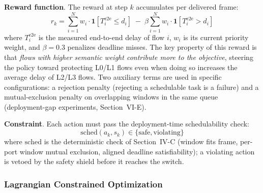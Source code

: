 \documentclass[conference]{IEEEtran}
\begin{document}
\textbf{Reward function}. The reward at step $k$ accumulates per delivered frame:
\begin{equation}
r_k = \sum_{i=1}^{N} w_i \cdot \mathbf{1}[T_i^{\text{e2e}} \leq d_i] \;-\; \beta \sum_{i=1}^{N} w_i \cdot \mathbf{1}[T_i^{\text{e2e}} > d_i]
\end{equation}
where $T_i^{\text{e2e}}$ is the measured end-to-end delay of flow $i$, $w_i$ is its current priority weight, and $\beta = 0.3$ penalizes deadline misses. The key property of this reward is that \textit{flows with higher semantic weight contribute more to the objective}, steering the policy toward protecting L0/L1 flows even when doing so increases the average delay of L2/L3 flows. Two auxiliary terms are used in specific configurations: a rejection penalty (rejecting a schedulable task is a failure) and a mutual-exclusion penalty on overlapping windows in the same queue (deployment-gap experiments, Section~VI-E).

\textbf{Constraint}. Each action must pass the deployment-time schedulability check:
\begin{equation}
\text{sched}(a_k, s_k) \in \{\text{safe}, \text{violating}\}
\end{equation}
where $\text{sched}$ is the deterministic check of Section~IV-C (window fits frame, per-port window mutual exclusion, aligned deadline satisfiability); a violating action is vetoed by the safety shield before it reaches the switch.

\subsubsection{Lagrangian Constrained Optimization}
\end{document}
